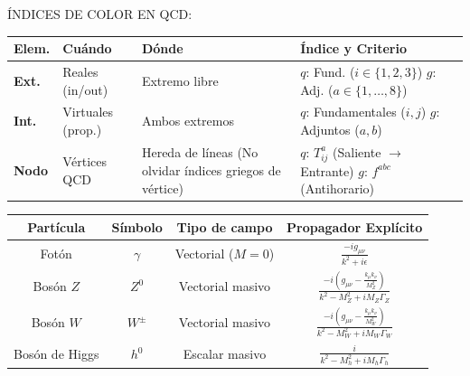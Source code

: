 \begin{center}
    
ÍNDICES DE COLOR EN QCD:
\setlength{\tabcolsep}{3pt}
\renewcommand{\arraystretch}{1.}
\begin{tabular}{|p{0.9cm}|p{1.3cm}|p{2cm}|p{3.5cm}|}
\hline
\textbf{Elem.} & \textbf{Cuándo} & \textbf{Dónde} & \textbf{Índice y Criterio} \\ \hline
\textbf{Ext.} & Reales (in/out) & Extremo libre & $q$: Fund. ($i \in \{1,2,3\}$) \newline $g$: Adj. ($a \in \{1,\dots,8\}$) \\ \hline
\textbf{Int.} & Virtuales (prop.) & Ambos extremos & $q$: Fundamentales ($i, j$) \newline $g$: Adjuntos ($a, b$) \\ \hline
\textbf{Nodo} & Vértices QCD & Hereda de líneas (No olvidar índices griegos de vértice) & $q$: $T^a_{ij}$ (Saliente $\rightarrow$ Entrante) \newline $g$: $f^{abc}$ (Antihorario) \\ \hline
\end{tabular}

\end{center}

 \newcolumn


{
\centering


\begin{tabular}{cccc}
\toprule
\textbf{Partícula} & \textbf{Símbolo} & \textbf{Tipo de campo} & \textbf{Propagador Explícito} \\ \midrule
Fotón & $\gamma$ & Vectorial ($M=0$) & $\displaystyle \frac{-i g_{\mu\nu}}{k^2 + i\epsilon}$ \\ \addlinespace[0.3cm]
Bosón $Z$ & $Z^0$ & Vectorial masivo & $\displaystyle \frac{-i \left(g_{\mu\nu} - \frac{k_\mu k_\nu}{M_Z^2}\right)}{k^2 - M_Z^2 + iM_Z\Gamma_Z}$ \\ \addlinespace[0.3cm]
Bosón $W$ & $W^\pm$ & Vectorial masivo & $\displaystyle \frac{-i \left(g_{\mu\nu} - \frac{k_\mu k_\nu}{M_W^2}\right)}{k^2 - M_W^2 + iM_W\Gamma_W}$ \\ \addlinespace[0.3cm]
Bosón de Higgs & $h^0$ & Escalar masivo & $\displaystyle \frac{i}{k^2 - M_h^2 + iM_h\Gamma_h}$ \\ \bottomrule
\end{tabular}

}



